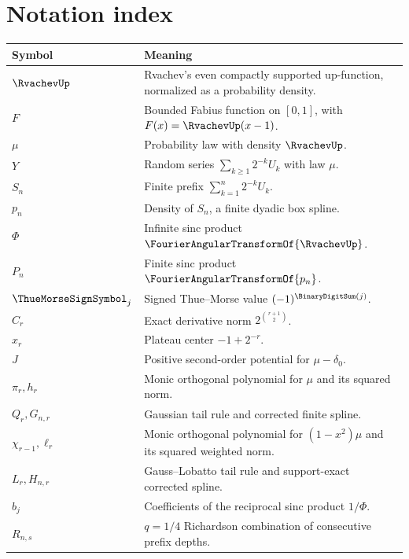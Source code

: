 \documentclass[11pt]{article}
\numberwithin{equation}{section}
\theoremstyle{definition}
\theoremstyle{remark}
\begin{document}
\section{Notation index}
\label{p1:app:notation}

\begin{center}
\begin{tabularx}{0.98\textwidth}{@{}p{}X@{}}
\toprule
Symbol & Meaning\\
\midrule
$\RvachevUp$ & Rvachev's even compactly supported up-function, normalized as a probability density.\\
$F$ & Bounded Fabius function on $[0,1]$, with $F(x)=\RvachevUp(x-1)$.\\
$\mu$ & Probability law with density $\RvachevUp$.\\
$Y$ & Random series $\sum_{k\ge1}2^{-k}U_k$ with law $\mu$.\\
$S_n$ & Finite prefix $\sum_{k=1}^n2^{-k}U_k$.\\
$p_n$ & Density of $S_n$, a finite dyadic box spline.\\
$\Phi$ & Infinite sinc product $\FourierAngularTransformOf{\RvachevUp}$.\\
$P_n$ & Finite sinc product $\FourierAngularTransformOf{p_n}$.\\
$\ThueMorseSignSymbol_j$ & Signed Thue--Morse value $(-1)^{\BinaryDigitSum(j)}$.\\
$C_r$ & Exact derivative norm $2^{\binom{r+1}{2}}$.\\
$x_r$ & Plateau center $-1+2^{-r}$.\\
$J$ & Positive second-order potential for $\mu-\delta_0$.\\
$\pi_r,h_r$ & Monic orthogonal polynomial for $\mu$ and its squared norm.\\
$Q_r,G_{n,r}$ & Gaussian tail rule and corrected finite spline.\\
$\chi_{r-1},\ell_r$ & Monic orthogonal polynomial for $(1-x^2)\mu$ and its squared weighted norm.\\
$L_r,H_{n,r}$ & Gauss--Lobatto tail rule and support-exact corrected spline.\\
$b_j$ & Coefficients of the reciprocal sinc product $1/\Phi$.\\
$R_{n,s}$ & $q=1/4$ Richardson combination of consecutive prefix depths.\\
\bottomrule
\end{tabularx}
\end{center}
\end{document}
